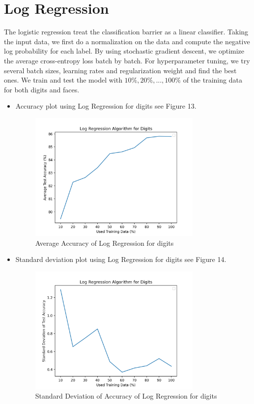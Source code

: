 \documentclass{article}
\begin{document}
\section*{Log Regression}
The logistic regression treat the classification barrier as a linear classifier.  Taking the input data, we first do a normalization on the data and compute the negative log probability for each label. By using stochastic gradient descent, we optimize the average cross-entropy loss batch by batch. For hyperparameter tuning, we try several batch sizes, learning rates and regularization weight and find the best ones. We train and test the model with $10\%, 20\%, ..., 100\%$ of the training data for both digits and faces.
\begin{itemize}
    \item Accuracy plot using Log Regression for digits see Figure 13.
    \begin{figure}
        \centering
        \includegraphics[width=0.8\textwidth]{logDi.png}
        \caption{Average Accuracy of Log Regression for digits}
    \end{figure}
    
    \item Standard deviation plot using Log Regression for digits see Figure 14.
    \begin{figure}
        \centering
        \includegraphics[width=0.8\textwidth]{logDiSd.png}
        \caption{Standard Deviation of Accuracy of Log Regression for digits}
    \end{figure}


\end{itemize}
\end{document}
